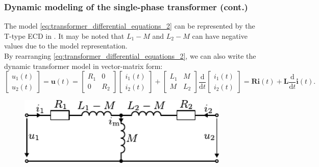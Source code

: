\begin{frame}
	\frametitle{Dynamic modeling of the single-phase transformer (cont.)}
		The model \eqref{eq:transformer_differential_equations_2} can be represented by the T-type ECD in . It may be noted that $L_1-M$ and $L_2-M$ can have negative values due to the model representation. 
		\\[1em] \pause
		By rearranging \eqref{eq:transformer_differential_equations_2}, we can also write the dynamic transformer model in vector-matrix form:
		\begin{equation}
			\begin{bmatrix}	u_1(t)\\u_2(t) \end{bmatrix} = \bm{u}(t) = \begin{bmatrix} R_1 & 0 \\ 0 & R_2 \end{bmatrix} \begin{bmatrix} i_1(t)\\i_2(t) \end{bmatrix} + \begin{bmatrix} L_1 & M \\ M & L_2 \end{bmatrix} \frac{\mathrm{d}}{\mathrm{d}t} \begin{bmatrix} i_1(t)\\i_2(t) \end{bmatrix} = \bm{R}\bm{i}(t) + \bm{L}\frac{\mathrm{d}}{\mathrm{d}t}\bm{i}(t).  
			\label{eq:transformer_differential_equations_matrix_form}
		\end{equation}
\begin{figure}
\begin{columns}
	\begin{column}{0.55\textwidth}
            \centering
            \includegraphics[width=0.9\textwidth]{fig/lec04/Transformer_T_ECD.pdf}
    \end{column}
\end{columns}
\end{figure}
\end{frame}

